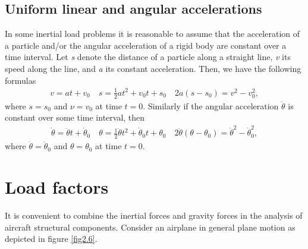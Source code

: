 \documentclass{AeroStructure-ERJohnson}
\begin{document}
\subsection{Uniform linear and angular accelerations}\label{sec2.2.4}

In some inertial load problems it is reasonable to assume that the acceleration of a particle and/or the angular acceleration of a rigid body are constant over a time interval. Let \textit{s} denote the distance of a particle along a straight line, \textit{v} its speed along the line, and \textit{a }its constant acceleration. Then, we have the following formulas
\begin{align}\label{eq2.14}
v=a t+v_{0} \quad s=\frac{1}{2} a t^{2}+v_{0} t+s_{0} \quad 2 a\left(s-s_{0}\right)=v^{2}-v_{0}^{2},
\end{align}
where $s=s_{0}$ and $\nu=v_{0}$ at time $t=0$. Similarly if the angular acceleration $\ddot{\theta}$ is constant over some time interval, then
\begin{align}\label{eq2.15}
\dot{\theta}=\ddot{\theta} t+\dot{\theta}_{0} \quad \theta=\frac{1}{2} \ddot{\theta} t^{2}+\dot{\theta}_{0} t+\theta_{0} \quad 2 \ddot{\theta}\left(\theta-\theta_{0}\right)=\dot{\theta}^{2}-\dot{\theta}_{0}^{2},
\end{align}
where $\dot{\theta}=\dot{\theta}_{0}$ and $\theta=\theta_{0}$ at time $t=0$.

\section{Load factors}\label{sec2.3}

It is convenient to combine the inertial forces and gravity forces in the analysis of aircraft structural components. Consider an airplane in general plane motion as depicted in figure \ref{fig2.6}.

{\def\thefigure{2.6}
}
\end{document}
